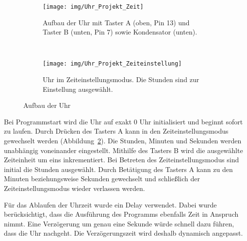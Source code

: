 \begin{figure}[p]
    \centering
    \begin{subfigure}[b]{0.6\linewidth}
        \centering
        \texttt{[image: img/Uhr\_Projekt\_Zeit]}
        \caption{Aufbau der Uhr mit Taster A (oben, Pin 13) und Taster B (unten, Pin 7) sowie Kondensator (unten).}\label{fig:zeit}
    \end{subfigure}\enspace%
    \\
    \begin{subfigure}[b]{0.6\linewidth}
        \centering
        \texttt{[image: img/Uhr\_Projekt\_Zeiteinstellung]}
        \caption{Uhr im Zeiteinstellungsmodus. Die Stunden sind zur Einstellung ausgewählt.}\label{fig:zeiteinstell}
    \end{subfigure}
    \caption{Aufbau der Uhr}\label{fig:uhr}
\end{figure}

Bei Programmstart wird die Uhr auf exakt 0 Uhr initialisiert und beginnt sofort zu laufen. Durch Drücken des Tasters A kann in den Zeiteinstellungsmodus gewechselt werden  (Abbildung~\ref{fig:zeiteinstell}). Die Stunden, Minuten und Sekunden werden unabhängig voneinander eingestellt. Mithilfe des Tasters B wird die ausgewählte Zeiteinheit um eins inkrementiert. Bei Betreten des Zeiteinstellungsmodus sind initial die Stunden ausgewählt. Durch Betätigung des Tasters A kann zu den Minuten beziehungsweise Sekunden gewechselt und schließlich der Zeiteinstellungsmodus wieder verlassen werden.

Für das Ablaufen der Uhrzeit wurde ein Delay verwendet. Dabei wurde berücksichtigt, dass die Ausführung des Programms ebenfalls Zeit in Anspruch nimmt. Eine Verzögerung um genau eine Sekunde würde schnell dazu führen, dass die Uhr nachgeht. Die Verzögerungszeit wird deshalb dynamisch angepasst.
